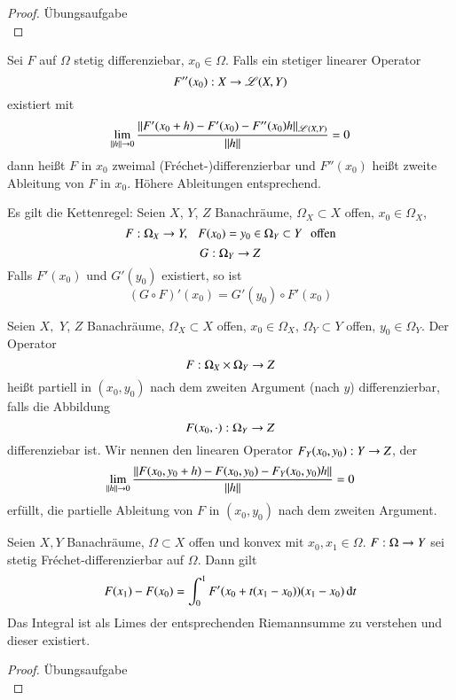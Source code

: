 \begin{proof} 
    Übungsaufgabe \[\]
\end{proof}

\begin{defi}
    Sei $F$ auf $\Omega$ stetig differenziebar, $x_0\in \Omega$. Falls ein stetiger linearer Operator
    \[
        F''(x_0):X\rightarrow \mathscr L(X,Y)
    \]
    existiert mit
    \[
        \lim_{\|h\|\rightarrow 0}\frac{\|F'(x_0+h)-F'(x_0)-F''(x_0)h\|_{\mathscr L(X,Y)}}{\|h\|}=0
    \]
    dann heißt $F$ in $x_0$ zweimal (Fréchet-)differenzierbar und $F''(x_0)$ heißt zweite Ableitung
    von $F$ in $x_0$. Höhere Ableitungen entsprechend.
\end{defi}

\begin{remark}
    Es gilt die Kettenregel:
    Seien $X$, $Y$, $Z$ Banachräume, $\Omega_X\subset X$ offen, $x_0\in \Omega_X$,
    \[
        F:\Omega_X\rightarrow Y, \hspace{.25cm} F(x_0)=y_0\in \Omega_Y\subset Y \hspace{.25cm} \text{offen}
    \]
    \[
        G:\Omega_Y\rightarrow Z
    \]
    Falls $F'(x_0)$ und $G'(y_0)$ existiert, so ist 
    \[
    (G\circ F)'(x_0)=G'(y_0)\circ F'(x_0)
    \]
\end{remark}

\begin{defi}
    Seien $X,$ $Y$, $Z$ Banachräume, $\Omega_X\subset X$ offen, $x_0\in \Omega_X$, $\Omega_Y\subset Y$ 
    offen, $y_0\in \Omega_Y$. Der Operator
    \[
        F: \Omega_X \times \Omega_Y \rightarrow Z 
    \]
    heißt partiell in $(x_0,y_0)$ nach dem zweiten Argument (nach $y$) differenzierbar, falls die 
    Abbildung 
    \[
        F(x_0, \cdot) : \Omega_Y \rightarrow Z 
    \]
    differenziebar ist. Wir nennen den linearen Operator $F_Y(x_0,y_0): Y\rightarrow Z$, der
    \[
        \lim_{\|h\|\rightarrow 0} \frac{\| F(x_0,y_0+h) - F(x_0,y_0) - F_Y( x_0,y_0)h \|}{\|h\|} = 0 
    \]
    erfüllt, die partielle Ableitung von $F$ in $(x_0,y_0)$ nach dem zweiten Argument.
\end{defi}

\begin{prop}\label{1.10}
    Seien $X,Y$ Banachräume, $\Omega \subset X $ offen und konvex mit $x_0, x_1\in \Omega$. 
    $F: \Omega \rightarrow Y$ sei stetig Fréchet-differenzierbar auf $\Omega$. Dann gilt
    \[
        F(x_1)-F(x_0)=\int_{0}^1 F'(x_0+t(x_1-x_0))(x_1-x_0)\, \mathrm{d} t
    \]
    Das Integral ist als Limes der entsprechenden Riemannsumme zu verstehen und dieser existiert.
\end{prop}

\begin{proof}
    Übungsaufgabe \[\]
\end{proof}

